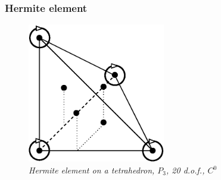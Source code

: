 \documentclass[10pt,a4paper]{article}
\begin{document}
\subsubsection{Hermite element}

\begin{figure}[H]
  \begin{center}
    \includegraphics[width=6cm,angle=0]{getfemlist_tetrahedron_hermite.eps}
  \end{center}
  \caption{ \it Hermite element on a tetrahedron, $P_3$, 20 d.o.f., $C^0$}
  \label{fig:tetrahedron_hermite}
\end{figure}
\end{document}

